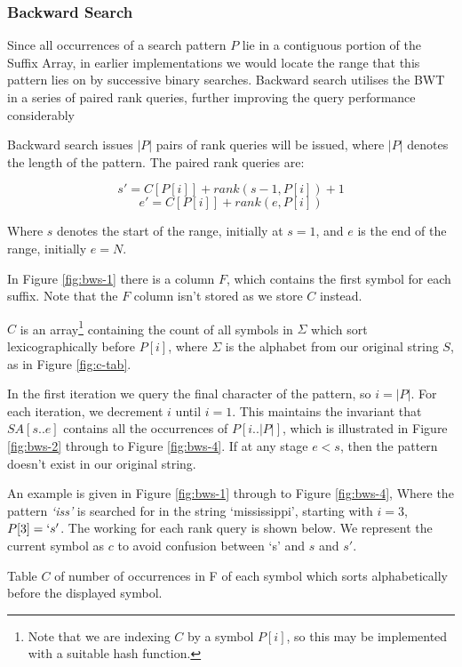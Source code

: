 \subsubsection{Backward Search}
Since all occurrences of a search pattern $P$ lie in a contiguous portion of the 
Suffix Array, in earlier implementations we would locate the range that this 
pattern lies on by successive binary searches. Backward search utilises the BWT 
in a series of paired rank queries, further improving the query performance 
considerably ~\cite{CN08, FGM09, ferragina07, GMR06, MN07:rankselect,
MN07:selfindex, marin2003, MN06}

Backward search issues $|P|$ pairs of rank queries will be issued, where $|P|$ 
denotes the length of the pattern. The paired rank queries are:

					$$ s' = C[P[i]] + rank(s - 1, P[i]) + 1$$
					$$ e' = C[P[i]] + rank(e, P[i])$$

Where $s$ denotes the start of the range, initially at $s = 1$, and $e$ is the 
end of the range, initially $e = N$.

In Figure \ref{fig:bws-1} there is a column $F$, which contains the first 
symbol for each suffix. Note that the $F$ column isn't stored as we store 
$C$ instead.

$C$ is an array\footnote{Note that we are indexing $C$ by a symbol $P[i]$, so 
this may be implemented with a suitable hash function.} containing the count of 
all symbols in $\Sigma$ which sort lexicographically before $P[i]$, where 
$\Sigma$ is the alphabet from our original string $S$, as in Figure 
\ref{fig:c-tab}.

In the first iteration 
we query the final character of the pattern, so $i = |P|$.  For each 
iteration, we decrement $i$ until $i = 1$. This maintains the invariant that
$SA[s..e]$ contains all the occurrences of $P[i..|P|]$, which is illustrated in 
Figure \ref{fig:bws-2} through to Figure \ref{fig:bws-4}. If at any stage $e < 
s$, then the pattern doesn't exist in our original string.

An example is given in Figure \ref{fig:bws-1} through to Figure \ref{fig:bws-4},
Where the pattern \emph{`iss'} is searched for in the string `mississippi',
starting with $i = 3$, $P[3] = `s'$. The working for each rank query is shown 
below. We represent the current symbol as $c$ to avoid confusion between `s' and 
$s$ and $s'$.


			{Table $C$ of number of occurrences in F of each symbol which
			sorts alphabetically before the displayed symbol.}

